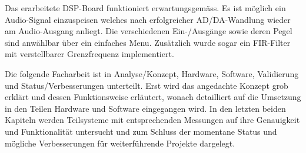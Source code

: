 Das erarbeitete DSP-Board funktioniert erwartungsgemäss. Es ist möglich ein Audio-Signal einzuspeisen welches nach erfolgreicher AD/DA-Wandlung wieder am Audio-Ausgang anliegt. Die verschiedenen Ein-/Ausgänge sowie deren Pegel sind anwählbar über ein einfaches Menu. Zusätzlich wurde sogar ein FIR-Filter mit verstellbarer Grenzfrequenz implementiert.


Die folgende Facharbeit ist in Analyse/Konzept, Hardware, Software, Validierung und Status/Verbesserungen unterteilt. Erst wird das angedachte Konzept grob erklärt und dessen Funktionsweise erläutert, wonach detailliert auf die Umsetzung in den Teilen Hardware und Software eingegangen wird. In den letzten beiden Kapiteln werden Teilsysteme mit entsprechenden Messungen auf ihre Genauigkeit und Funktionalität untersucht und zum Schluss der momentane Status und mögliche Verbesserungen für weiterführende Projekte dargelegt.

%
%
%
%
